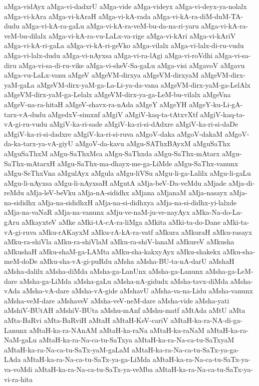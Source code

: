 {aMga-vidAyx
aMga-vi-dadxrU
aMga-vide
aMga-videyx
aMga-vi-deyx-ya-nolalx
aMga-vi-kAra
aMga-vi-kAraH
aMga-vi-kA-rada
aMga-vi-kA-ra-diM-duM-TA-dudu
aMga-vi-kA-ra-gaLu
aMga-vi-kA-ra-veM-bu-da-na-ri-yaru
aMga-vi-kA-ra-veM-bu-dilalx
aMga-vi-kA-ra-vu-LaLx-va-rige
aMga-vi-kAri
aMga-vi-kAriV
aMga-vi-kA-ri-gaLa
aMga-vi-kA-ri-geVko
aMga-vilalx
aMga-vi-lalx-di-ru-vudu
aMga-vi-lalx-dudu
aMga-vi-nAyxsa
aMga-vi-ra-lAgi
aMga-vi-roVdhi
aMga-vi-sa-diru
aMga-vi-sa-di-ru-vike
aMga-vi-sheV-Sa-gaLu
aMga-visi
aMgavoV
aMgavu
aMga-vu-LaLx-vanu
aMgeV
aMgeVM-dirxya
aMgeVM-dirxyaM
aMgeVM-dirx-yaM-gaLa
aMgeVM-dirx-yaM-ga-La-Li-ya-da-vana
aMgeVM-dirx-yaM-ga-LelAlx
aMgeVM-dirx-yaM-ga-Lelalx
aMgeVM-dirx-ya-ga-LeM-bu-vilalx
aMgeVna
aMgeV-na-ra-hitaH
aMgeV-shavx-ra-nAda
aMgeY
aMgeYH
aMgeY-ku-Li-gA-tarx-vA-dudu
aMgedxV-simxnf
aMgiV
aMgiV-kaq-ta-tAtxvXtf
aMgiV-kaq-ta-vA-gi-ru-vudu
aMgiV-ka-ri-sade
aMgiV-ka-ri-si-dAdxre
aMgiV-ka-ri-si-daDe
aMgiV-ka-ri-si-dadxre
aMgiV-ka-ri-si-ruva
aMgoV-daka
aMgoV-dakaM
aMgoV-da-ka-tarx-ya-vA-giyU
aMgoV-da-kavu
aMgu-SAThxBAyxM
aMguSaThx
aMguSaThxM
aMgu-SaThxMca
aMgu-SaThxda
aMgu-SaThx-mAtarx
aMgu-SaThx-mAtarxH
aMgu-SaThx-ma-dhayx-me-ga-LiMde
aMgu-SaThx-vanunx
aMgu-SeThxVna
aMgulAyx
aMgula
aMgu-liVSu
aMgu-li-ga-Lalilx
aMgu-li-gaLu
aMgu-li-nAyxsa
aMgu-li-nAyxsaH
aMgutA
aMja-beV-Da-veMdu
aMjade
aMja-di-reMdu
aMja-leV-beVku
aMja-nA-sididhx
aMjana
aMjanaM
aMja-nasayx
aMja-na-sididhx
aMja-na-sididhxH
aMja-na-si-didhxya
aMja-na-si-didhx-yi-lalxde
aMja-na-vaNaR
aMja-na-vanunx
aMju-ve-naM-ju-ve-nayAyx
aMka-Na-do-La-gAru
aMkayxteV
aMke
aMki-tA-cA-ra-liMga
aMkita
aMki-ta-do-Dane
aMki-ta-vA-gi-ruva
aMku-rAKayxM
aMku-rA-kA-ra-vatf
aMkura
aMkuraH
aMku-rasayx
aMku-ra-shiVla
aMku-ra-shiVlaM
aMku-ra-shiV-lanaM
aMkureV
aMkusha
aMkushaH
aMku-shaM-ga-LAMta
aMku-sha-kakxyAyx
aMku-shakekx
aMku-sha-meM-doDe
aMku-sha-vA-gi-puRdu
aMsha
aMsha-BU-ta-nA-darU
aMshaH
aMsha-dalilx
aMsha-diMda
aMsha-ga-LanUnx
aMsha-ga-Lanunx
aMsha-ga-LeM-dare
aMsha-ga-LiMda
aMsha-gaLu
aMsha-nA-gidudx
aMsha-tavx-diMda
aMsha-vAda
aMsha-vA-dare
aMsha-vA-gide
aMshavU
aMsha-va-na-Lidu
aMsha-vanunx
aMsha-veM-dare
aMshaveV
aMsha-veV-neM-dare
aMsha-vide
aMsha-yati
aMshiV-BUtAH
aMshiV-BUta
aMshu-mAnf
aMshu-matf
aMtAda
aMtU
aMta
aMta-BaRvi
aMta-BaRviH
aMtaH
aMtaH-KeV-cariV
aMtaH-ka-ra-NA-di-ga-Lanunx
aMtaH-ka-ra-NAnAM
aMtaH-ka-raNa
aMtaH-ka-raNaM
aMtaH-ka-ra-NaM-gaLu
aMtaH-ka-ra-Na-ca-tu-SaTxya
aMtaH-ka-ra-Na-ca-tu-SaTxyaM
aMtaH-ka-ra-Na-ca-tu-SaTx-yaM-gaLaM
aMtaH-ka-ra-Na-ca-tu-SaTx-ya-ga-LAda
aMtaH-ka-ra-Na-ca-tu-SaTx-ya-ga-LiMda
aMtaH-ka-ra-Na-ca-tu-SaTx-ya-va-voMdi
aMtaH-ka-ra-Na-ca-tu-SaTx-ya-veMba
aMtaH-ka-ra-Na-ca-tu-SaTx-ya-vi-ra-hita
}
